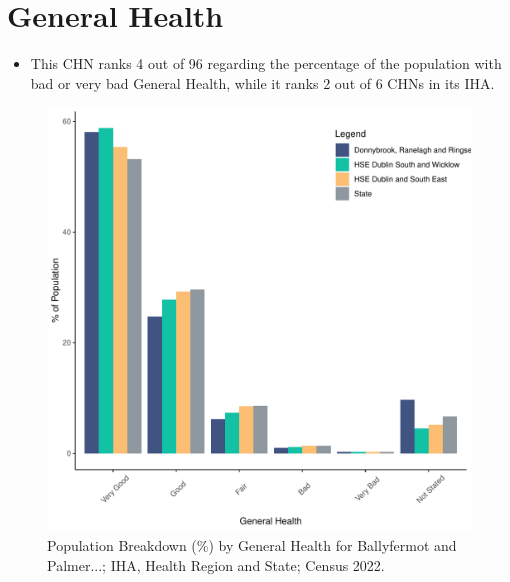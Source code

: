 \documentclass{article}
\begin{document}
\pagebreak

\section{General Health}\label{sect:GenHealth}
\begin{itemize}
\item  This CHN ranks  4 out of 96 regarding the percentage of the population with bad or very bad General Health, while it ranks   2 out of 6 CHNs in its IHA.
\end{itemize}
\begin{figure}[h]
	\centering
	\includegraphics[width = 150mm]{../figures/GenED.pdf}
	\caption{Population Breakdown (\%) by General Health for Ballyfermot and Palmer...; IHA, Health Region and State;  Census 2022.}
	\label{fig:2ae19629-1a6a-13a3-e055-000000000001}
	\end{figure}
\end{document}
